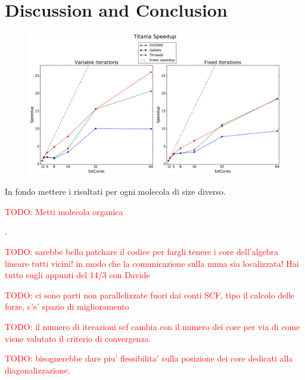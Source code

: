 \documentclass[a4paper,12pt]{article}
\newcommand\mynotes[1]{\begin{flushright}

\textcolor{red}{TODO: #1}\end{flushright}}
\begin{document}
\section{Discussion and Conclusion}
\begin{figure}[hhh!]
\centerline{ \includegraphics[width=1.2\linewidth]{concl_titania.pdf}	}
	\caption{}
	\label{fig:conclTitania}
\end{figure}





In fondo mettere i risultati per ogni molecola di size diverso.

\mynotes{Metti molecola organica}.

\mynotes{sarebbe bello patchare il codice per fargli tenere i core dell'algebra lineare tutti vicini! in modo che la comunicazione sulla numa sia localizzata! Hai tutto sugli appunti del 14/3 con Davide}

\mynotes{ci sono parti non parallelizzate fuori dai conti SCF, tipo il calcolo delle forze, c'e' spazio di miglioramento}
\mynotes{il numero di iterazioni scf cambia con il numero dei core per via di come viene valutato il criterio di convergenza.}
\mynotes{bisognerebbe dare piu' flessibilita' sulla posizione dei core dedicati alla diagonalizzazione.}

\newpage
\end{document}
